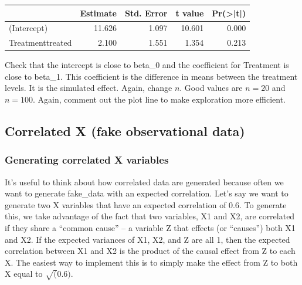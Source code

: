 \documentclass[]{book}
\begin{document}
\begin{tabular}{l|r|r|r|r}
\hline
  & Estimate & Std. Error & t value & Pr(>|t|)\\
\hline
(Intercept) & 11.626 & 1.097 & 10.601 & 0.000\\
\hline
Treatmenttreated & 2.100 & 1.551 & 1.354 & 0.213\\
\hline
\end{tabular}

Check that the intercept is close to beta\_0 and the coefficient for
Treatment is close to beta\_1. This coefficient is the difference in
means between the treatment levels. It is the simulated effect. Again,
change \(n\). Good values are \(n=20\) and \(n=100\). Again, comment out
the plot line to make exploration more efficient.

\subsection{Correlated X (fake observational
data)}\label{correlated-x-fake-observational-data}

\subsubsection{Generating correlated X
variables}\label{generating-correlated-x-variables}

It's useful to think about how correlated data are generated because
often we want to generate fake\_data with an expected correlation. Let's
say we want to generate two X variables that have an expected
correlation of 0.6. To generate this, we take advantage of the fact that
two variables, X1 and X2, are correlated if they share a ``common
cause'' -- a variable Z that effects (or ``causes'') both X1 and X2. If
the expected variances of X1, X2, and Z are all 1, then the expected
correlation between X1 and X2 is the product of the causal effect from Z
to each X. The easiest way to implement this is to simply make the
effect from Z to both X equal to \(\sqrt(0.6)\).
\end{document}
